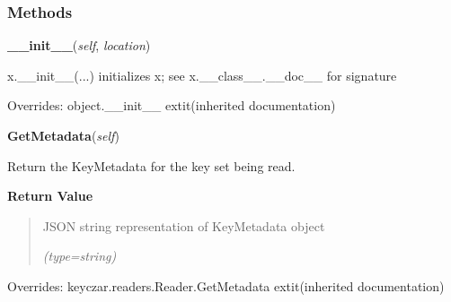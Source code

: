  \subsubsection{Methods}

    \vspace{0.5ex}

\hspace{.8\funcindent}\begin{boxedminipage}{\funcwidth}

    \raggedright \textbf{\_\_init\_\_}(\textit{self}, \textit{location})

\setlength{\parskip}{2ex}
    x.\_\_init\_\_(...) initializes x; see x.\_\_class\_\_.\_\_doc\_\_ for 
    signature

\setlength{\parskip}{1ex}
      Overrides: object.\_\_init\_\_ 	extit{(inherited documentation)}

    \end{boxedminipage}

    \vspace{0.5ex}

\hspace{.8\funcindent}\begin{boxedminipage}{\funcwidth}

    \raggedright \textbf{GetMetadata}(\textit{self})

\setlength{\parskip}{2ex}
    Return the KeyMetadata for the key set being read.

\setlength{\parskip}{1ex}
      \textbf{Return Value}
    \vspace{-1ex}

      \begin{quote}
      JSON string representation of KeyMetadata object

      {\it (type=string)}

      \end{quote}

      Overrides: keyczar.readers.Reader.GetMetadata 	extit{(inherited documentation)}

    \end{boxedminipage}

    \vspace{0.5ex}

